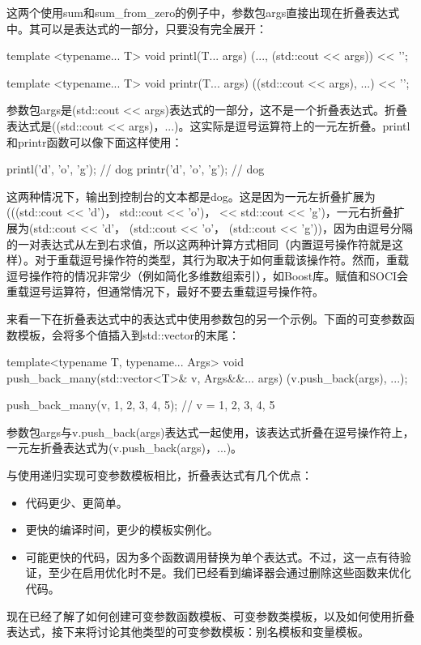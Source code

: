 这两个使用sum和sum_from_zero的例子中，参数包args直接出现在折叠表达式中。其可以是表达式的一部分，只要没有完全展开：

\begin{cppcode}
template <typename... T>
void printl(T... args)
{
	(..., (std::cout << args)) << '\n';
}

template <typename... T>
void printr(T... args)
{
	((std::cout << args), ...) << '\n';
}
\end{cppcode}

参数包args是(std::cout << args)表达式的一部分，这不是一个折叠表达式。折叠表达式是((std::cout << args)，...)。这实际是逗号运算符上的一元左折叠。printl和printr函数可以像下面这样使用：

\begin{cppcode}
printl('d', 'o', 'g'); // dog
printr('d', 'o', 'g'); // dog
\end{cppcode}

这两种情况下，输出到控制台的文本都是dog。这是因为一元左折叠扩展为(((std::cout << 'd')， std::cout << 'o')， << std::cout << 'g')，一元右折叠扩展为(std::cout << 'd'， (std::cout << 'o'， (std::cout << 'g'))，因为由逗号分隔的一对表达式从左到右求值，所以这两种计算方式相同（内置逗号操作符就是这样）。对于重载逗号操作符的类型，其行为取决于如何重载该操作符。然而，重载逗号操作符的情况非常少（例如简化多维数组索引），如Boost库。赋值和SOCI会重载逗号运算符，但通常情况下，最好不要去重载逗号操作符。

来看一下在折叠表达式中的表达式中使用参数包的另一个示例。下面的可变参数函数模板，会将多个值插入到std::vector的末尾：

\begin{cppcode}
template<typename T, typename... Args>
void push_back_many(std::vector<T>& v, Args&&... args)
{
	(v.push_back(args), ...);
}

push_back_many(v, 1, 2, 3, 4, 5); // v = {1, 2, 3, 4, 5}
\end{cppcode}

参数包args与v.push_back(args)表达式一起使用，该表达式折叠在逗号操作符上，一元左折叠表达式为(v.push_back(args)，...)。

与使用递归实现可变参数模板相比，折叠表达式有几个优点：

\begin{itemize}
  \item 代码更少、更简单。

  \item 更快的编译时间，更少的模板实例化。

  \item 可能更快的代码，因为多个函数调用替换为单个表达式。不过，这一点有待验证，至少在启用优化时不是。我们已经看到编译器会通过删除这些函数来优化代码。
\end{itemize}

现在已经了解了如何创建可变参数函数模板、可变参数类模板，以及如何使用折叠表达式，接下来将讨论其他类型的可变参数模板：别名模板和变量模板。




















